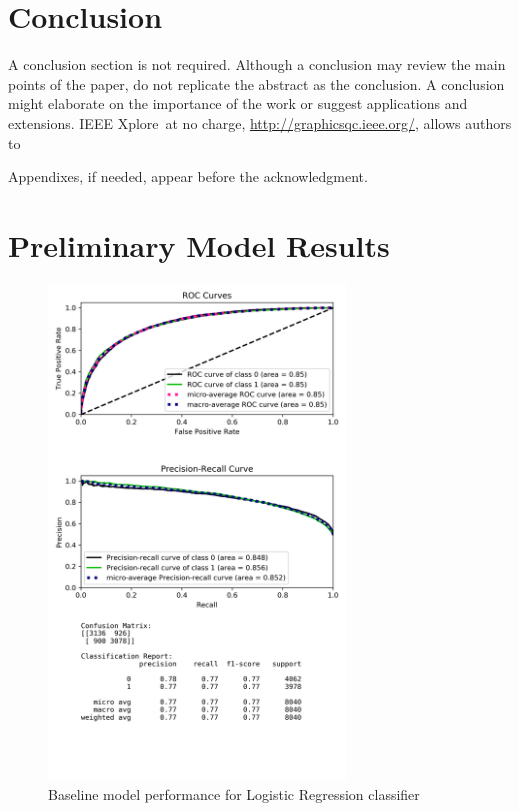 \documentclass[journal,twoside,web]{ieeecolor}
\begin{document}
\section{Conclusion}
A conclusion section is not required. Although a conclusion may review the 
main points of the paper, do not replicate the abstract as the conclusion. A 
conclusion might elaborate on the importance of the work or suggest 
applications and extensions. 
IEEE Xplore\textregistered\ at no charge, \underline{http://graphicsqc.ieee.org/}, allows authors to 

\appendices

Appendixes, if needed, appear before the acknowledgment.


\clearpage{}
\section{Preliminary Model Results}
\begin{figure}[h!]
  \centering
  \includegraphics[width=3.1in]{project/code/preliminary-logregression-downsampled_f1score.png}
  \caption{Baseline model performance for Logistic Regression classifier}
  \label{fig:prelim-logreg}
\end{figure}
\end{document}
